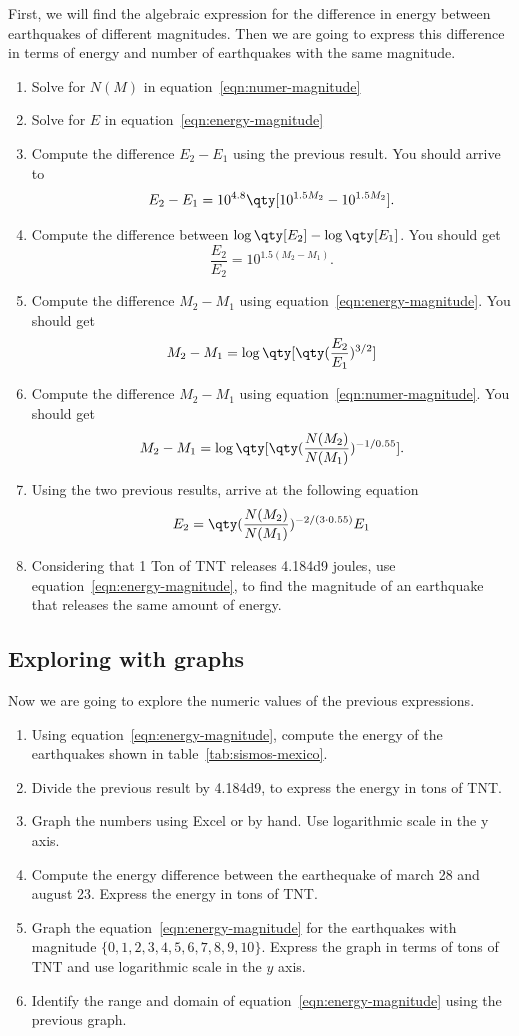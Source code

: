 \documentclass[../main.tex]{subfiles}
\begin{document}
First, we will find the algebraic expression for the difference in energy between earthquakes of different magnitudes.
Then we are going to express this difference in terms of energy and number of earthquakes with the same magnitude.
\begin{enumerate}
    \item Solve for $N(M)$ in equation~\eqref{eqn:numer-magnitude}
    \item Solve for $E$ in equation~\eqref{eqn:energy-magnitude}
    \item Compute the difference $E_2 - E_1$ using the previous result. You should arrive to \[E_2-E_1 = 10^{4.8}\qty[10^{1.5 M_2} - 10^{1.5 M_2}].\]
    \item Compute the difference between $\log\qty[E_2] - \log\qty[E_1]$. You should get \[\frac{E_2}{E_2} = 10^{1.5(M_2-M_1)}.\]
    \item Compute the difference $M_2-M_1$ using equation~\eqref{eqn:energy-magnitude}. You should get \[M_2-M_1 = \log\qty[\qty(\frac{E_2}{E_1})^{3/2}]\]
    \item Compute the difference $M_2-M_1$ using equation~\eqref{eqn:numer-magnitude}. You should get \[M_2-M_1 = \log\qty[\qty(\frac{N(M_2)}{N(M_1)})^{-1/0.55}].\]
    \item Using the two previous results, arrive at the following equation \[E_2 = \qty(\frac{N(M_2)}{N(M_1)})^{-2/(3\cdot 0.55)}E_1\]
    \item Considering that 1 Ton of TNT releases \num{4.184d9} joules, use equation~\eqref{eqn:energy-magnitude}, to find the magnitude of an earthquake that releases the same amount of energy.
\end{enumerate}

\subsection{Exploring with graphs}

Now we are going to explore the numeric values of the previous expressions.
\begin{enumerate}
    \item Using equation~\eqref{eqn:energy-magnitude}, compute the energy of the earthquakes shown in table~\ref{tab:sismos-mexico}.
    \item Divide the previous result by \num{4.184d9}, to express the energy in tons of TNT.
    \item Graph the numbers using Excel or by hand. Use logarithmic scale in the y axis.
    \item Compute the energy difference between the earthequake of march 28 and august 23. Express the energy in tons of TNT.
    \item Graph the equation~\eqref{eqn:energy-magnitude} for the earthquakes with magnitude $\{0,1,2,3,4,5,6,7,8,9,10\}$. Express the graph in terms of tons of TNT and use logarithmic scale in the $y$ axis.
    \item Identify the range and domain of equation~\eqref{eqn:energy-magnitude} using the previous graph.
\end{enumerate}
\end{document}
